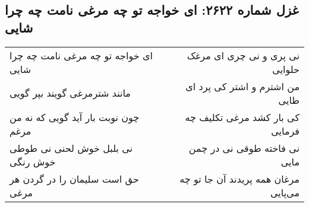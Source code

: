 \begin{center}
\section*{غزل شماره ۲۶۲۲: ای خواجه تو چه مرغی نامت چه چرا شایی}
\label{sec:2622}
\begin{longtable}{l p{0.5cm} r}
ای خواجه تو چه مرغی نامت چه چرا شایی
&&
نی پری و نی چری ای مرغک حلوایی
\\
مانند شترمرغی گویند بپر گویی
&&
من اشترم و اشتر کی پرد ای طایی
\\
چون نوبت بار آید گویی که نه من مرغم
&&
کی بار کشد مرغی تکلیف چه فرمایی
\\
نی بلبل خوش لحنی نی طوطی خوش رنگی
&&
نی فاخته طوقی نی در چمن مایی
\\
حق است سلیمان را در گردن هر مرغی
&&
مرغان همه پریدند آن جا تو چه می‌پایی
\\
\end{longtable}
\end{center}

